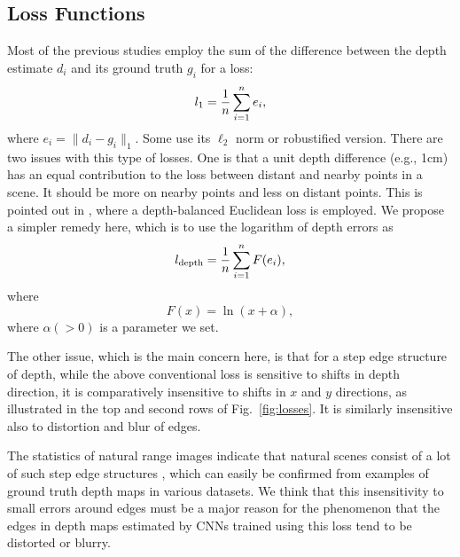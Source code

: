 \documentclass[10pt,twocolumn,letterpaper]{article}
\begin{document}
\subsection{Loss Functions}
\label{sec:losses}

Most of the previous studies employ 
the sum of the difference between the depth estimate $d_i$ and its ground truth $g_i$ for a loss: 
\begin{equation}
    l_{\rm 1}=\frac{1}{n}\sum_{i=1}^n e_i,
\end{equation}
where $e_i = \|d_i - g_i\|_1$.
Some use its $\ell_2$ norm or robustified version. 
There are two issues with this type of losses. One is that a unit depth difference (e.g., 1cm) has an equal contribution to the loss between distant and nearby points in a scene. It should be more on nearby points and less on distant points. This is pointed out in \cite{lee2018single}, where a depth-balanced Euclidean loss is employed.
We propose a simpler remedy here, which is to use 
the logarithm of depth errors as 
\begin{equation}
    l_{\rm depth}=\frac{1}{n}\sum_{i=1}^n F(e_i),
\end{equation}
where
\begin{equation}
    F(x) = \ln(x+\alpha),
\end{equation}
where $\alpha( >0)$ is a parameter we set. 
\begin{comment}
When $d_i > g_i $, the derivative of $l_{\rm depth}$ with respect to model parameters $\omega$ is
\begin{equation}
    \frac{\partial l_{\rm depth}}{\partial \omega} = \frac{1}{n}\sum_{i=1}^n \frac{1}{e_i+\alpha}\frac{\partial d_i}{\partial \omega}.
\end{equation}
As seen, for a larger depth value $d_i$, the effect of $\frac{\partial d_i}{\partial \omega}$ will be reduced by $\frac{1}{e_i+\alpha}$. 
(For depth estimation, a larger depth value tends to produce larger $e_i$.) 
\end{comment}

The other issue, which is the main concern here, is that for a step edge structure of depth, while the above conventional loss is sensitive to shifts in depth direction, it is comparatively insensitive to shifts in $x$ and $y$ directions, as illustrated in the top and second rows of Fig.~\ref{fig:losses}. 
It is similarly insensitive also to distortion and blur of edges. 

The statistics of natural range images indicate that natural scenes consist of a lot of such step edge structures \cite{huang2000statistics}, which can easily be confirmed from examples of ground truth depth maps in various datasets. 
We think that this insensitivity to small errors around edges must be a major reason for the phenomenon that the edges in depth maps estimated by CNNs trained using this loss tend to be distorted or blurry.
\end{document}
